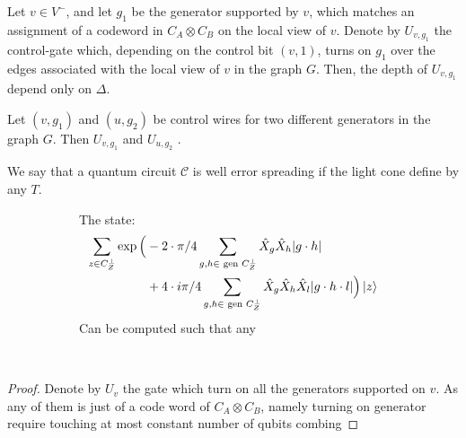 \documentclass[manuscript,screen,review]{acmart}
\begin{document}
\begin{claim} 
  Let $v \in V^{-}$, and let $g_{1}$ be the generator supported by $v$, which matches an assignment of a codeword in $C_{A}\otimes C_{B}$ on the local view of $v$. Denote by $U_{v, g_{1}}$ the control-gate which, depending on the control bit $(v,1)$, turns on $g_{1}$ over the edges associated with the local view of $v$ in the graph $G$. Then, the depth of $U_{v,g_{1}}$ depend only on $\Delta$.   
\end{claim}

\begin{claim}
  Let $(v,g_{1})$ and $(u,g_{2})$ be control wires for two different generators in the graph $G$. Then $U_{v,g_{1}}$ and $U_{u,g_{2}}$ . 
\end{claim}

\begin{definition}
  We say that a quantum circuit $\mathcal{C}$ is well error spreading if the light cone define by any $T$. 
\end{definition}

    
\begin{figure}[h]
  \begin{subfigure}[b]{0.45\textwidth}
\begin{claim}
  The state:
  \begin{equation*}
    \begin{split}
      \sum_{z \in C_{Z}^{\perp}}  \exp \Big(  & -  2 \cdot \pi/4 \sum_{g ,h \in \text{ gen } C_{Z}^{\perp}} \hat{X}_{g}\hat{X}_{h}|g\cdot h| \\
 & +  4 \cdot i\pi/4 \sum_{g,h \in \text{ gen } C_{Z}^{\perp}} \hat{X}_{g}\hat{X}_{h}\hat{X}_{l}|g\cdot h \cdot l|  \Big) \ket{z}
    \end{split}
  \end{equation*}
  Can be computed such that any 
\end{claim}  \end{subfigure}
  \begin{subfigure}[b]{0.05\textwidth}
    \
  \end{subfigure}
  \begin{subfigure}[b]{0.45\textwidth} 
  \end{subfigure} 
\end{figure}



\begin{proof}
  Denote by $U_{v}$ the gate which turn on all the generators supported on $v$. As any of them is just of a code word of $C_{A}\otimes C_{B}$, namely turning on generator require touching at most constant number of qubits combing  
\end{proof}
\end{document}
